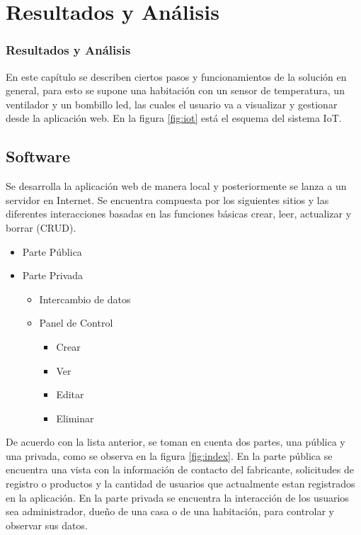 \section{Resultados y Análisis}
\begin{frame}
\frametitle{Resultados y Análisis}

En este capítulo se describen ciertos pasos y funcionamientos de la solución en general, para esto se supone una habitación con un sensor de temperatura, un ventilador y un bombillo led, las cuales el usuario va a visualizar y gestionar desde la aplicación web. En la figura \ref{fig:iot} está el esquema del sistema IoT.

\end{frame}

\begin{frame}

\subsection{Software}

Se desarrolla la aplicación web de manera local y posteriormente se lanza a un servidor en Internet. Se encuentra compuesta por los siguientes sitios y las diferentes interacciones basadas en las funciones básicas crear, leer, actualizar y borrar (CRUD).

\begin{itemize}
	\item Parte Pública
	\item Parte Privada
	\begin{itemize}
		\item Intercambio de datos
		\item Panel de Control
		\begin{itemize}
			\item Crear
			\item Ver
			\item Editar
			\item Eliminar 
		\end{itemize}
	\end{itemize}
\end{itemize}

De acuerdo con la lista anterior, se toman en cuenta dos partes, una pública y una privada, como se observa en la figura \ref{fig:index}. En la parte pública se encuentra una vista con la información de contacto del fabricante, solicitudes de registro o productos y la cantidad de usuarios que actualmente estan registrados en la aplicación. En la parte privada se encuentra la interacción de los usuarios sea administrador, dueño de una casa o de una habitación, para controlar y observar sus datos.\\
\end{frame}


